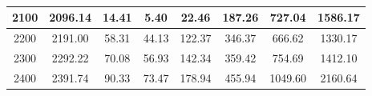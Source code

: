 \begin{table}[!h]
\begin{adjustwidth}{-2cm}{-2cm}
\begin{tabular}{|c|c|c|c|c|c|c|c|}
			2100 & 2096.14 & 14.41 & 5.40 & 22.46 & 187.26 & 727.04 & 1586.17 \\ \hline
			2200 & 2191.00 & 58.31 & 44.13 & 122.37 & 346.37 & 666.62 & 1330.17 \\ \hline
			2300 & 2292.22 & 70.08 & 56.93 & 142.34 & 359.42 & 754.69 & 1412.10 \\ \hline
			2400 & 2391.74 & 90.33 & 73.47 & 178.94 & 455.94 & 1049.60 & 2160.64 \\ \hline
		\end{tabular}
		\centering
		\caption{}
		\label{result::}
	\end{adjustwidth}
\end{table}

